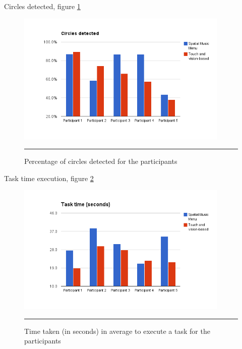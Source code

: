 

Circles detected, figure \ref{fig:resultscircles}

\begin{figure}[htbp]
	\centering
		\includegraphics[width=0.9\textwidth,height=\textheight,keepaspectratio]{./Figures/results_circles.png}
		\rule{35em}{1pt}
	\caption[Results circle detections]{Percentage of circles detected for the participants}
	\label{fig:resultscircles}
\end{figure}


Task time execution, figure \ref{fig:resultstasktime}

\begin{figure}[htbp]
	\centering
		\includegraphics[width=0.9\textwidth,height=\textheight,keepaspectratio]{./Figures/results_task_time.png}
		\rule{35em}{1pt}
	\caption[Results task time]{Time taken (in seconds) in average to execute a task for the participants}
	\label{fig:resultstasktime}
\end{figure}

